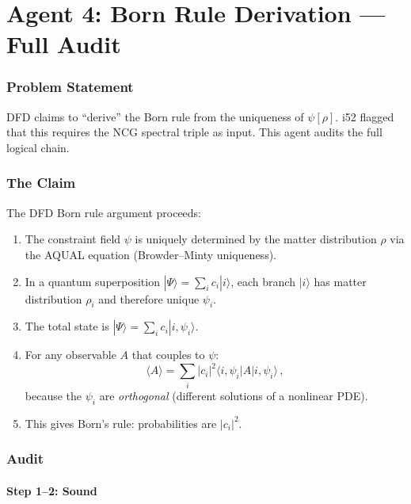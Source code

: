 \documentclass[11pt,a4paper]{article}
\begin{document}
\part{Agent 4: Born Rule Derivation --- Full Audit}
\label{part:bornrule}

\section{Problem Statement}

DFD claims to ``derive'' the Born rule from the uniqueness of $\psi[\rho]$. i52 flagged that this requires the NCG spectral triple as input. This agent audits the full logical chain.

\section{The Claim}

The DFD Born rule argument proceeds:
\begin{enumerate}
\item The constraint field $\psi$ is uniquely determined by the matter distribution $\rho$ via the AQUAL equation (Browder--Minty uniqueness).
\item In a quantum superposition $|\Psi\rangle = \sum_i c_i |i\rangle$, each branch $|i\rangle$ has matter distribution $\rho_i$ and therefore unique $\psi_i$.
\item The total state is $|\Psi\rangle = \sum_i c_i |i, \psi_i\rangle$.
\item For any observable $A$ that couples to $\psi$:
\begin{equation}
\langle A \rangle = \sum_i |c_i|^2 \langle i, \psi_i | A | i, \psi_i\rangle\,,
\end{equation}
because the $\psi_i$ are \emph{orthogonal} (different solutions of a nonlinear PDE).
\item This gives Born's rule: probabilities are $|c_i|^2$.
\end{enumerate}

\section{Audit}

\subsection{Step 1--2: Sound}
\end{document}
